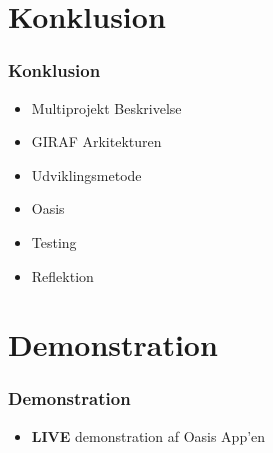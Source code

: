 \documentclass{beamer}
\begin{document}
\section{Konklusion}

\begin{frame}
	\frametitle{Konklusion}
	\begin{itemize}
		\item Multiprojekt Beskrivelse
		\item GIRAF Arkitekturen
		\item Udviklingsmetode
		\item Oasis
		\item Testing
		\item Reflektion
	\end{itemize}
\end{frame}

\section{Demonstration}

\begin{frame}
	\frametitle{Demonstration}
	\begin{itemize}
		\item \textbf{LIVE} demonstration af Oasis App'en
	\end{itemize}
\end{frame}
\end{document}
